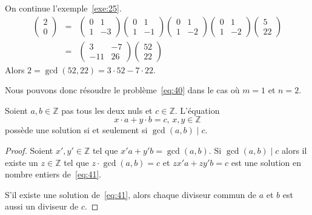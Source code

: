 \begin{example}
  \label{exe:50}
  On continue l'exemple~\ref{exe:25}.
  \begin{eqnarray*} 
    \begin{pmatrix}
      2 \\ 0
    \end{pmatrix} & = & 
    \begin{pmatrix}
      0 &1 \\
      1 & -3
    \end{pmatrix}
    \begin{pmatrix}
      0 &1 \\
      1 & -1
    \end{pmatrix}
    \begin{pmatrix}
      0 &1 \\
      1 & -2
    \end{pmatrix}
    \begin{pmatrix}
      0 &1 \\
      1 & -2
    \end{pmatrix}
    \begin{pmatrix}
     5 \\ 22
    \end{pmatrix} \\
   &  = & 
  \begin{pmatrix}
    3 & -7 \\
    -11 & 26 
  \end{pmatrix}
  \begin{pmatrix}
    52 \\22
  \end{pmatrix}
  \end{eqnarray*}
  Alors $2 = \gcd(52,22) = 3 ⋅52 -7 ⋅22$. 
\end{example}

Nous pouvons donc résoudre le problème~\eqref{eq:40} dans le cas où $m=1$ et $n=2$.

\begin{theorem}
  \label{thr:49}
  Soient $a,b ∈ℤ$ pas tous les deux nuls et $c ∈ℤ$. L'équation
  \begin{equation}
    \label{eq:41}
    x ⋅a + y ⋅b = c, \, x,y ∈ℤ
  \end{equation}
  possède une solution si et seulement si $\gcd(a,b) \mid c$. 
\end{theorem}
\begin{proof}
  Soient $x',y' ∈ℤ$ tel que $x' a + y'b = \gcd(a,b)$. Si $\gcd(a,b) \mid c$ alors il existe un $z ∈ℤ$ tel que $z ⋅\gcd(a,b) = c$ et $z x' a + z y'b = c$ est une solution en nombre entiers de~\eqref{eq:41}.

  S'il existe une solution de~\eqref{eq:41}, alors chaque diviseur commun de $a$ et $b$ est aussi un diviseur de $c$. 
\end{proof}

